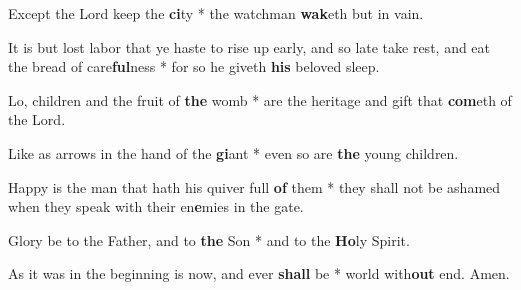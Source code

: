 \begin{multicols}{2}
	Except the Lord keep the \textbf{ci}ty * the watchman \textbf{wak}eth but in vain.
	
	It is but lost labor that ye haste to rise up early, and so late take rest, and eat the bread of care\textbf{ful}ness * for so he giveth \textbf{his} beloved sleep.
	
	Lo, children and the fruit of \textbf{the} womb * are the heritage and gift that \textbf{com}eth of the Lord.
	
	Like as arrows in the hand of the \textbf{gi}ant * even so are \textbf{the} young children.
	
	Happy is the man that hath his quiver full \textbf{of} them * they shall not be ashamed when they speak with their en\textbf{e}mies in the gate.
	
	Glory be to the Father, and to \textbf{the} Son * and to the \textbf{Ho}ly Spirit.
	
	As it was in the beginning is now, and ever \textbf{shall} be * world with\textbf{out} end. Amen.
\end{multicols}